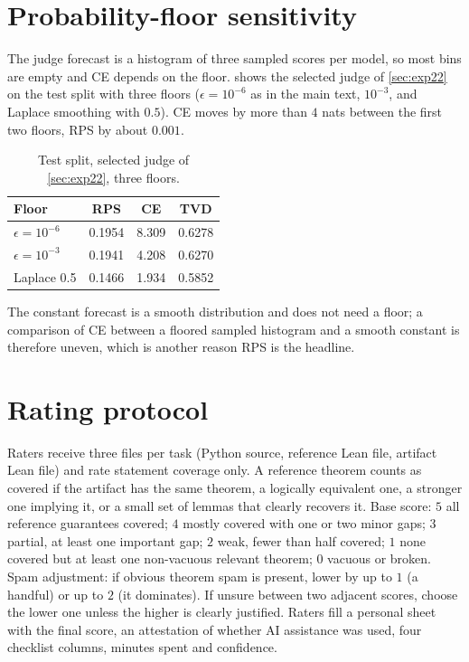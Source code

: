 \section{Probability-floor sensitivity}
\label{app:floor}
The judge forecast is a histogram of three sampled scores per model, so most bins are empty and CE depends on the floor.
 shows the selected judge of \cref{sec:exp22} on the test split with three floors ($\epsilon=10^{-6}$ as in the main text, $10^{-3}$, and Laplace smoothing with $0.5$).
CE moves by more than $4$ nats between the first two floors, RPS by about $0.001$.
\begin{table}[H]
\caption{Test split, selected judge of \cref{sec:exp22}, three floors.}
\label{tab:floor}
\centering\small
\begin{tabular}{lccc}
\toprule
Floor & RPS & CE & TVD\\
\midrule
$\epsilon=10^{-6}$ & 0.1954 & 8.309 & 0.6278\\
$\epsilon=10^{-3}$ & 0.1941 & 4.208 & 0.6270\\
Laplace 0.5 & 0.1466 & 1.934 & 0.5852\\
\bottomrule
\end{tabular}
\end{table}
The constant forecast is a smooth distribution and does not need a floor; a comparison of CE between a floored sampled histogram and a smooth constant is therefore uneven, which is another reason RPS is the headline.

\section{Rating protocol}
\label{app:rubric}
Raters receive three files per task (Python source, reference Lean file, artifact Lean file) and rate statement coverage only. A reference theorem counts as covered if the artifact has the same theorem, a logically equivalent one, a stronger one implying it, or a small set of lemmas that clearly recovers it.
Base score: $5$ all reference guarantees covered; $4$ mostly covered with one or two minor gaps; $3$ partial, at least one important gap; $2$ weak, fewer than half covered; $1$ none covered but at least one non-vacuous relevant theorem; $0$ vacuous or broken.
Spam adjustment: if obvious theorem spam is present, lower by up to $1$ (a handful) or up to $2$ (it dominates).
If unsure between two adjacent scores, choose the lower one unless the higher is clearly justified.
Raters fill a personal sheet with the final score, an attestation of whether AI assistance was used, four checklist columns, minutes spent and confidence.

